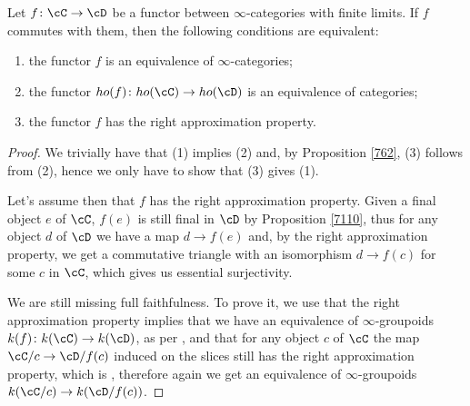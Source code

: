 \begin{thm}\label{7610}

  Let $f\colon\cC\rightarrow\cD$ be a functor between $\infty$-categories with
  finite limits. If $f$ commutes with them, then the following conditions are
  equivalent:
  \begin{enumerate}
    \item the functor $f$ is an equivalence of $\infty$-categories;
    \item the functor $ho(f)\colon ho(\cC)\rightarrow ho(\cD)$ is an equivalence
      of categories;
    \item the functor $f$ has the right approximation property.
  \end{enumerate}
\end{thm}
\begin{proof}

  We trivially have that (1) implies (2) and, by Proposition \ref{762}, (3)
  follows from (2), hence we only have to show that (3) gives (1).

  \noindent
  Let's assume then that $f$ has the right approximation property.
  Given a final object $e$ of $\cC$, $f(e)$ is still final in $\cD$ by
  Proposition \ref{7110}, thus for any object $d$ of $\cD$ we have a map
  $d\rightarrow f(e)$
  and, by the right approximation property, we get a commutative triangle with
  an isomorphism $d\rightarrow f(c)$ for some $c$ in $\cC$, which gives
  us essential surjectivity.

  \noindent
  We are still missing full faithfulness. To prove it, we use that the right
  approximation property implies that we have an equivalence of
  $\infty$-groupoids $k(f)\colon k(\cC)\rightarrow k(\cD)$, as per \cite[Lem.\
  7.6.7]{Cis19}, and that for any object $c$ of $\cC$ the map
  $\cC/c\rightarrow\cD/f(c)$ induced on the slices still has the right
  approximation property, which is \cite[Prop.\ 7.6.7]{Cis19}, therefore again
  we get an equivalence of $\infty$-groupoids $k(\cC/c)\rightarrow k(\cD/f(c))$.


\end{proof}

